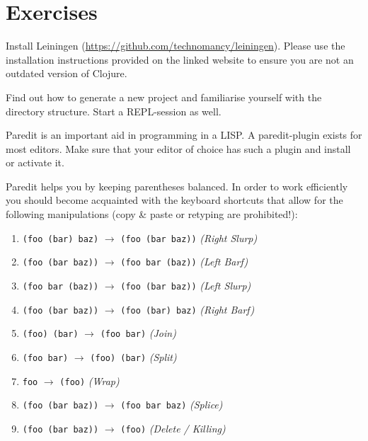 \documentclass[11pt,a4paper]{article}
\begin{document}
	\section{Exercises}

	\begin{exercise}[Leiningen]
		Install Leiningen (\url{https://github.com/technomancy/leiningen}).
		Please use the installation instructions provided on the linked website
		to ensure you are not an outdated version of Clojure.
		
		Find out how to generate a new project
		and familiarise yourself with the directory structure.
		Start a REPL-session as well.
	\end{exercise}
	
	
	\begin{exercise}[Paredit]
		Paredit is an important aid in programming in a LISP.
		A paredit-plugin exists for most editors.
		Make sure that your editor of choice has such a plugin
		and install or activate it.
		
		
		Paredit helps you by keeping parentheses balanced.
		In order to work efficiently you should
		become acquainted with the keyboard shortcuts that allow for the following manipulations
		(copy \& paste or retyping are prohibited!):
		
		\begin{enumerate}[label=\alph*)]
			\item
			\texttt{(foo (bar) baz)} $\longrightarrow$ \texttt{(foo (bar baz))} \textit{(Right Slurp)}
			\item
			\texttt{(foo (bar baz))} $\longrightarrow$ \texttt{(foo bar (baz))} \textit{(Left Barf)}
			\item
			\texttt{(foo bar (baz))} $\longrightarrow$ \texttt{(foo (bar baz))} \textit{(Left Slurp)}
			\item
			\texttt{(foo (bar baz))} $\longrightarrow$ \texttt{(foo (bar) baz)} \textit{(Right Barf)}
			\item
			\texttt{(foo) (bar)} $\longrightarrow$ \texttt{(foo bar)} \textit{(Join)}
			\item
			\texttt{(foo bar)} $\longrightarrow$ \texttt{(foo) (bar)} \textit{(Split)}
			\item
			\texttt{foo} $\longrightarrow$ \texttt{(foo)} \textit{(Wrap)}
			\item
			\texttt{(foo (bar baz))} $\longrightarrow$ \texttt{(foo bar baz)} \textit{(Splice)}
			\item
			\texttt{(foo (bar baz))} $\longrightarrow$ \texttt{(foo)} \textit{(Delete / Killing)}
		\end{enumerate}
		
	\end{exercise}
	
\end{document}
